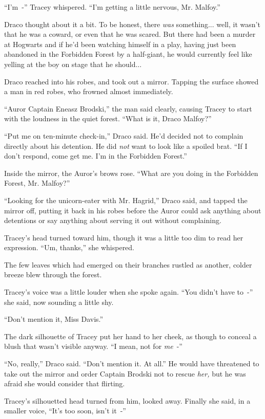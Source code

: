 ``I'm~-'' Tracey whispered. ``I'm getting a little nervous, Mr. Malfoy.''

Draco thought about it a bit. To be honest, there \emph{was} something... well, it wasn't that he was a coward, or even that he was scared. But there had been a murder at Hogwarts and if he'd been watching himself in a play, having just been abandoned in the Forbidden Forest by a half-giant, he would currently feel like yelling at the boy on stage that he should...

Draco reached into his robes, and took out a mirror. Tapping the surface showed a man in red robes, who frowned almost immediately.

``Auror Captain Eneasz Brodski,'' the man said clearly, causing Tracey to start with the loudness in the quiet forest. ``What is it, Draco Malfoy?''

``Put me on ten-minute check-in,'' Draco said. He'd decided not to complain directly about his detention. He did \emph{not} want to look like a spoiled brat. ``If I don't respond, come get me. I'm in the Forbidden Forest.''

Inside the mirror, the Auror's brows rose. ``What are you doing in the Forbidden Forest, Mr. Malfoy?''

``Looking for the unicorn-eater with Mr. Hagrid,'' Draco said, and tapped the mirror off, putting it back in his robes before the Auror could ask anything about detentions or say anything about serving it out without complaining.

Tracey's head turned toward him, though it was a little too dim to read her expression. ``Um, thanks,'' she whispered.

The few leaves which had emerged on their branches rustled as another, colder breeze blew through the forest.

Tracey's voice was a little louder when she spoke again. ``You didn't have to~-'' she said, now sounding a little shy.

``Don't mention it, Miss Davis.''

The dark silhouette of Tracey put her hand to her cheek, as though to conceal a blush that wasn't visible anyway. ``I mean, not for \emph{me}~-''

``No, really,'' Draco said. ``Don't mention it. At all.'' He would have threatened to take out the mirror and order Captain Brodski not to rescue \emph{her,} but he was afraid she would consider that flirting.

Tracey's silhouetted head turned from him, looked away. Finally she said, in a smaller voice, ``It's too soon, isn't it~-''

